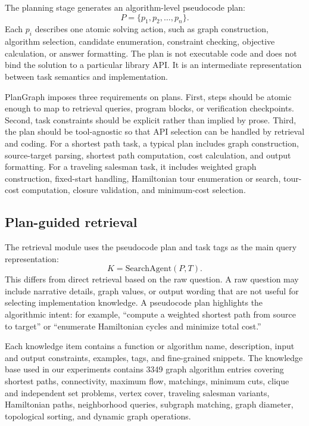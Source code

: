 \documentclass[pdflatex,iicol,sn-mathphys-num]{sn-jnl}
\theoremstyle{thmstyleone}
\theoremstyle{thmstyletwo}
\theoremstyle{thmstylethree}
\begin{document}
The planning stage generates an algorithm-level pseudocode plan:
\begin{equation}
P=\{p_1,p_2,\ldots,p_n\}.
\end{equation}
Each $p_i$ describes one atomic solving action, such as graph construction, algorithm selection, candidate enumeration, constraint checking, objective calculation, or answer formatting. The plan is not executable code and does not bind the solution to a particular library API. It is an intermediate representation between task semantics and implementation.

PlanGraph imposes three requirements on plans. First, steps should be atomic enough to map to retrieval queries, program blocks, or verification checkpoints. Second, task constraints should be explicit rather than implied by prose. Third, the plan should be tool-agnostic so that API selection can be handled by retrieval and coding. For a shortest path task, a typical plan includes graph construction, source-target parsing, shortest path computation, cost calculation, and output formatting. For a traveling salesman task, it includes weighted graph construction, fixed-start handling, Hamiltonian tour enumeration or search, tour-cost computation, closure validation, and minimum-cost selection.

\subsection{Plan-guided retrieval}

The retrieval module uses the pseudocode plan and task tags as the main query representation:
\begin{equation}
K=\mathrm{SearchAgent}(P,T).
\end{equation}
This differs from direct retrieval based on the raw question. A raw question may include narrative details, graph values, or output wording that are not useful for selecting implementation knowledge. A pseudocode plan highlights the algorithmic intent: for example, ``compute a weighted shortest path from source to target'' or ``enumerate Hamiltonian cycles and minimize total cost.''

Each knowledge item contains a function or algorithm name, description, input and output constraints, examples, tags, and fine-grained snippets. The knowledge base used in our experiments contains 3349 graph algorithm entries covering shortest paths, connectivity, maximum flow, matchings, minimum cuts, clique and independent set problems, vertex cover, traveling salesman variants, Hamiltonian paths, neighborhood queries, subgraph matching, graph diameter, topological sorting, and dynamic graph operations.
\end{document}
